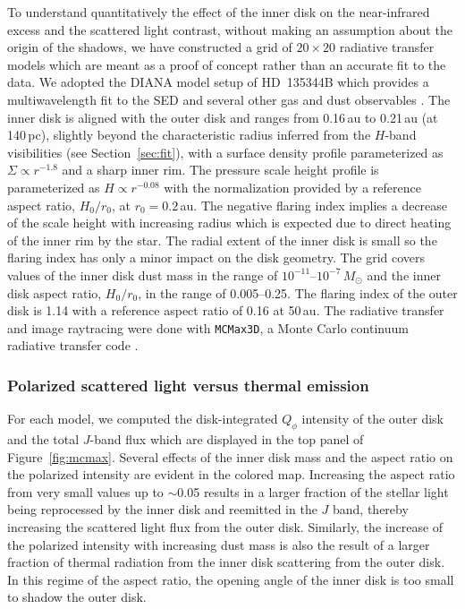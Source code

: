\documentclass[twocolumn,tighten]{aastex61}
\begin{document}
To understand quantitatively the effect of the inner disk on the near-infrared excess and the scattered light contrast, without making an assumption about the origin of the shadows, we have constructed a grid of $20 \times 20$ radiative transfer models which are meant as a proof of concept rather than an accurate fit to the data. We adopted the DIANA model setup of HD~135344B which provides a multiwavelength fit to the SED and several other gas and dust observables \citep{woitke2016}. The inner disk is aligned with the outer disk and ranges from 0.16\,au to 0.21\,au (at 140\,pc), slightly beyond the characteristic radius inferred from the $H$-band visibilities (see Section~\ref{sec:fit}), with a surface density profile parameterized as $\Sigma \propto r^{-1.8}$ and a sharp inner rim. The pressure scale height profile is parameterized as $H\propto r^{-0.08}$ with the normalization provided by a reference aspect ratio, $H_0/r_0$, at $r_0=0.2$\,au. The negative flaring index implies a decrease of the scale height with increasing radius which is expected due to direct heating of the inner rim by the star. The radial extent of the inner disk is small so the flaring index has only a minor impact on the disk geometry. The grid covers values of the inner disk dust mass in the range of $10^{-11}$--$10^{-7}$\,$M_\odot$ and the inner disk aspect ratio, $H_0/r_0$, in the range of 0.005--0.25. The flaring index of the outer disk is 1.14 with a reference aspect ratio of 0.16 at 50\,au. The radiative transfer and image raytracing were done with \texttt{MCMax3D}, a Monte Carlo continuum radiative transfer code \citep{min2009}.

\subsubsection{Polarized scattered light versus thermal emission}\label{sec:scattered_thermal}

For each model, we computed the disk-integrated $Q_\phi$ intensity of the outer disk and the total $J$-band flux which are displayed in the top panel of Figure~\ref{fig:mcmax}. Several effects of the inner disk mass and the aspect ratio on the polarized intensity are evident in the colored map. Increasing the aspect ratio from very small values up to $\sim$0.05 results in a larger fraction of the stellar light being reprocessed by the inner disk and reemitted in the $J$ band, thereby increasing the scattered light flux from the outer disk. Similarly, the increase of the polarized intensity with increasing dust mass is also the result of a larger fraction of thermal radiation from the inner disk scattering from the outer disk. In this regime of the aspect ratio, the opening angle of the inner disk is too small to shadow the outer disk.
\end{document}
